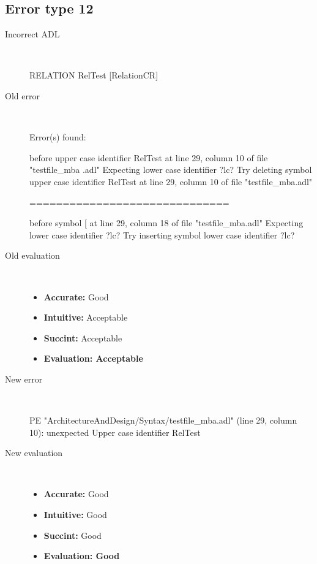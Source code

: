 \hrulefill

\subsection{Error type 12}
  \begin{description}
  \item[Incorrect ADL]~\\
\begin{adl}
RELATION RelTest [RelationCR]\end{adl}
  \item[Old error]~\\
\begin{haskell}
Error(s) found:

before upper case identifier RelTest at line 29, column 10 of file "testfile_mba
.adl"
Expecting lower case identifier ?lc?
Try deleting symbol upper case identifier RelTest at line 29, column 10 of file
"testfile_mba.adl"

==============================

before symbol [ at line 29, column 18 of file "testfile_mba.adl"
Expecting lower case identifier ?lc?
Try inserting symbol lower case identifier ?lc?\end{haskell}
  \item[Old evaluation]~\\
    \begin{itemize}
    \item \textbf{Accurate:} Good
    \item \textbf{Intuitive:} Acceptable
    \item \textbf{Succint:} Acceptable
    \item \textbf{Evaluation: Acceptable}
    \end{itemize}
  \item[New error]~\\
\begin{haskell}
PE "ArchitectureAndDesign/Syntax/testfile_mba.adl" (line 29, column 10):
unexpected Upper case identifier RelTest\end{haskell}
  \item[New evaluation]~\\
    \begin{itemize}
    \item \textbf{Accurate:} Good
    \item \textbf{Intuitive:} Good
    \item \textbf{Succint:} Good
    \item \textbf{Evaluation: Good
}
    \end{itemize}
  \end{description}

